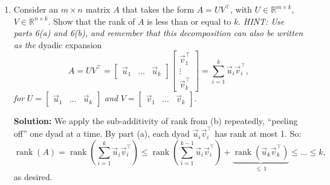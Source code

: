\documentclass[10pt]{article}
\theoremstyle{definition}
\theoremstyle{plain}
\newcommand{\RR}{\mathbb{R}}
\newcommand{\Range}{\mathcal{R}}
\DeclareMathOperator{\rank}{rank}
\begin{document}
\begin{enumerate}[label=(\alph*)]
    \textbf{Step 4: Chain the inequalities.}

    Combining Steps 2 and 3 and using $\rank(\cdot) = \dim(\Range(\cdot))$:
    \begin{equation}
        \rank(A + B) \leq \rank(A) + \rank(B).
    \end{equation}

    \begin{intuition}
    Adding matrices can only ``mix'' their ranges---the outputs of $A + B$ are sums of outputs from $A$ and $B$ individually. You can't create genuinely new directions this way, so the rank can't exceed the total number of independent directions from both matrices. (In fact, if $A$ and $B$ share range directions, the inequality is strict.)
    \end{intuition}

    \item Consider an $m \times n$ matrix $A$ that takes the form $A = UV^\top$, with $U \in \RR^{m \times k}$, $V \in \RR^{n \times k}$. Show that the rank of $A$ is less than or equal to $k$. \textit{HINT: Use parts 6(a) and 6(b), and remember that this decomposition can also be written as the} dyadic expansion
    \begin{equation}
        A = UV^\top = \begin{bmatrix} \vec{u}_1 & \ldots & \vec{u}_k \end{bmatrix} \begin{bmatrix} \vec{v}_1^\top \\ \vdots \\ \vec{v}_k^\top \end{bmatrix} = \sum_{i=1}^{k} \vec{u}_i \vec{v}_i^\top,
    \end{equation}
    \textit{for} $U = \begin{bmatrix} \vec{u}_1 & \ldots & \vec{u}_k \end{bmatrix}$ \textit{and} $V = \begin{bmatrix} \vec{v}_1 & \ldots & \vec{v}_k \end{bmatrix}$.

    \textbf{Solution:} We apply the sub-additivity of rank from (b) repeatedly, ``peeling off'' one dyad at a time. By part (a), each dyad $\vec{u}_i \vec{v}_i^\top$ has rank at most 1. So:
    \begin{equation}
        \rank(A) = \rank\left(\sum_{i=1}^{k} \vec{u}_i \vec{v}_i^\top\right) \leq \rank\left(\sum_{i=1}^{k-1} \vec{u}_i \vec{v}_i^\top\right) + \underbrace{\rank\left(\vec{u}_k \vec{v}_k^\top\right)}_{\leq\, 1} \leq \ldots \leq k,
    \end{equation}
    as desired.


\end{enumerate}
\end{document}
